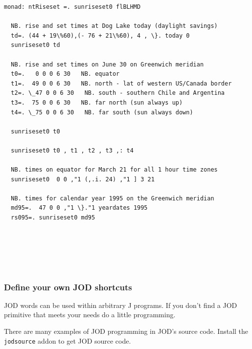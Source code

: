 \documentclass[11pt,letter,landscape]{article}
\begin{document}
\begin{Verbatim}[commandchars=\\\{\}]
monad: ntRiseset =. sunriseset0 flBLHMD

  NB. rise and set times at Dog Lake today (daylight savings)
  td=. (44 + 19\%60),(- 76 + 21\%60), 4 , \}. today 0
  sunriseset0 td

  NB. rise and set times on June 30 on Greenwich meridian
  t0=.   0 0 0 6 30   NB. equator
  t1=.  49 0 0 6 30   NB. north - lat of western US/Canada border
  t2=. \_47 0 0 6 30   NB. south - southern Chile and Argentina
  t3=.  75 0 0 6 30   NB. far north (sun always up)
  t4=. \_75 0 0 6 30   NB. far south (sun always down)

  sunriseset0 t0

  sunriseset0 t0 , t1 , t2 , t3 ,: t4

  NB. times on equator for March 21 for all 1 hour time zones
  sunriseset0  0 0 ,"1 (,.i. 24) ,"1 ] 3 21

  NB. times for calendar year 1995 on the Greenwich meridian
  md95=.  47 0 0 ,"1 \}."1 yeardates 1995
  rs095=. sunriseset0 md95






    \end{Verbatim}

    \subsubsection{Define your own JOD
shortcuts}\label{define-your-own-jod-shortcuts}

JOD words can be used within arbitrary J programs. If you don't find a
JOD primitive that meets your needs do a little programming.

There are many examples of JOD programming in JOD's source code. Install
the \texttt{jodsource} addon to get JOD source code.
\end{document}
